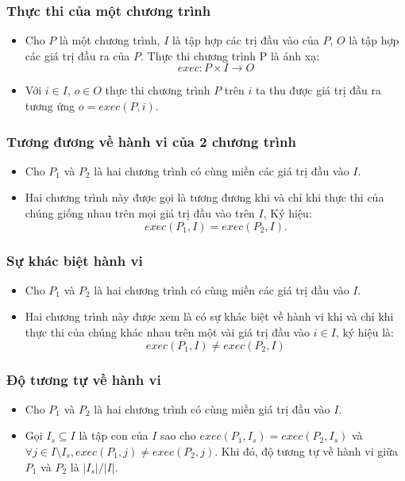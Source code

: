 \documentclass{beamer}
\begin{document}
\begin{frame}
  \frametitle{Thực thi của một chương trình}
  \begin{itemize}
  	\item Cho $P$ là một chương trình, $I$ là tập hợp các trị đầu vào của $P$, 
  	$O$ là tập hợp các giá trị đầu ra của $P$. 
  	Thực thi chương trình P là ánh xạ: 
  	\[exec: P \times I \rightarrow O\]
  	\item Với $i \in I$, $o \in O$ thực thi chương trình $P$ trên
  	$i$ ta thu được giá trị đầu ra tương ứng $o = exec(P, i)$.
  \end{itemize}  
\end{frame}


\begin{frame}
  \frametitle{Tương đương về hành vi của 2 chương trình}
  \begin{itemize}
  	\item Cho $P_{1}$ và $P_{2}$ là hai chương trình có cùng miền các giá trị
  	đầu vào $I$. 
  	\item Hai chương trình này được gọi là tương đương khi và chỉ
  	khi thực thi của chúng giống nhau trên mọi giá trị đầu vào trên $I$,
  	Ký hiệu: \[exec(P_{1}, I) = exec(P_{2}, I).\]
  \end{itemize}
 
\end{frame}


\begin{frame}
  \frametitle{Sự khác biệt hành vi}
  \begin{itemize}
  	\item Cho $P_{1}$ và $P_{2}$ là hai chương trình có cùng miền các giá trị
  	đầu vào $I$. 
  	\item Hai chương trình này được xem là có sự khác biệt về
  	hành vi khi và chỉ khi thực thi của chúng khác nhau trên một vài giá
  	trị đầu vào $i \in I$, ký hiệu là: \[exec(P_{1}, I) \neq exec(P_{2}, I)\]
  \end{itemize}

\end{frame}


\begin{frame}
  \frametitle{Độ tương tự về hành vi}
  \begin{itemize}
  	\item  Cho $P_{1}$ và $P_{2}$ là hai chương trình có cùng miền giá trị đầu
  	vào $I$. 
  	\item Gọi $I_{s} \subseteq I$ là tập con của $I$ sao cho
  	$exec(P_{1}, I_{s}) = exec(P_{2}, I_{s})$ và
  	$\forall j \in I \setminus I_{s}, exec(P_{1}, j) \neq exec(P_{2},
  	j)$. Khi đó, độ tương tự về hành vi giữa $P_1$ và $P_2$ là $|I_s|/|I|$.
  \end{itemize}
\end{frame}
\end{document}
